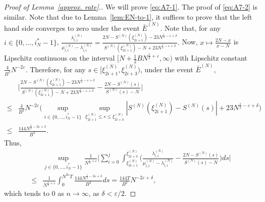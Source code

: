 \documentclass[11pt, reqno]{article}
\numberwithin{equation}{section}
\numberwithin{theorem}{section}
\begin{document}
\begin{appendix}
\begin{proof}[Proof of Lemma~\ref{approx. rate}.]
We will prove \eqref{eq:A7-1}. 
The proof of \eqref{eq:A7-2} is similar. 
Note that due to Lemma~\ref{lem:EN-to-1}, it suffices to prove that the left hand side converges to zero under the event $\bar{E}^{(N)}$.
Note that, for any $i \in\{0,...,i^*_N-1\}$,
$\frac{\lambda^{(N)}_{l,i}}{\mu^{(N)}_{l,i}-\lambda^{(N)}_{l,i}}=\frac{2N-S^{(N)}(\xi^{(N)}_{2i+1})- 23N^{\frac{1}{2}-\varepsilon+\delta}}{S^{(N)}(\xi^{(N)}_{2i+1})-N+ 23 N^{\frac{1}{2}-\varepsilon+\delta}}.$
Now, $x\mapsto\frac{2N-x}{x-N}$ is Lipschitz continuous on the interval $[ N+\frac{1}{2}BN^{\frac{1}{2}+\varepsilon},\infty)$ with Lipschitz constant $\frac{4}{B^2}N^{-2\varepsilon}$. Therefore, for any $s \in [\xi^{(N)}_{2i+1},\xi^{(N)}_{2i+3})$, under the event $\bar{E}^{(N)}$,
\begin{align*}
    &\Big|\frac{2N-S^{(N)}(\xi^{(N)}_{2i+1})- 23 N^{\frac{1}{2}-\varepsilon+\delta}}{S^{(N)}(\xi^{(N)}_{2i+1})-N+ 23 N^{\frac{1}{2}-\varepsilon+\delta}}-\frac{2N-S^{(N)}(s)}{S^{(N)}(s)-N}\Big|\\
    \leq & \frac{4}{B^2}N^{-2\varepsilon}\bigg(\sup_{i\in \{0,...,i^*_N-1\}}\sup_{\xi^{(N)}_{2i+1}\leq s\leq \xi^{(N)}_{2i+3}}\left|S^{(N)}(\xi^{(N)}_{2i+1})-S^{(N)}(s)\right|+23 N^{\frac{1}{2}-\varepsilon+\delta}\bigg)\\
    \leq & \frac{144 N^{\frac{1}{2}-3\varepsilon+\delta}}{B^2}.
\end{align*}
Thus,
\begin{align*}
     &\sup_{j\in\{0,...,i^*_N-1\}} \frac{1}{N^{\frac{1}{2}+\varepsilon}}\Big|\sum_{i=0}^j\int_{\xi^{(N)}_{2i+1}}^{\xi^{(N)}_{2i+3}} \Big(\frac{\lambda^{(N)}_{l,i}}{\mu^{(N)}_{l,i}-\lambda^{(N)}_{l,i}}-\frac{2N-S^{(N)}(s)}{S^{(N)}(s)-N}\Big)ds\Big|\\
     \leq & \frac{1}{N^{\frac{1}{2}+\varepsilon}}\int_{0}^{N^{2\varepsilon}T}\frac{144N^{\frac{1}{2}-3\varepsilon+\delta}}{B^2}ds = \frac{144 T}{B^2}N^{-2\varepsilon + \delta},
\end{align*}
which tends to $0$ as $n\to\infty$, as $\delta <  \varepsilon/2$.
\end{proof}




\end{appendix}
\end{document}
